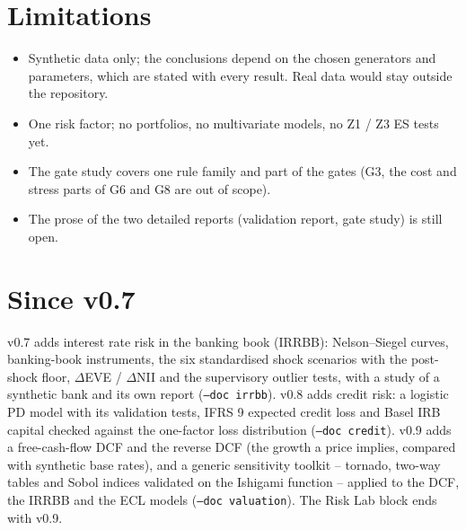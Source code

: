 \documentclass[11pt,a4paper]{article}
\begin{document}
\section*{Limitations}
\begin{itemize}
\item Synthetic data only; the conclusions depend on the chosen generators and parameters, which are stated with
  every result. Real data would stay outside the repository.
\item One risk factor; no portfolios, no multivariate models, no Z1 / Z3 ES tests yet.
\item The gate study covers one rule family and part of the gates (G3, the cost and stress parts of G6 and G8 are
  out of scope).
\item The prose of the two detailed reports (validation report, gate study) is still open.
\end{itemize}

\section*{Since v0.7}
v0.7 adds interest rate risk in the banking book (IRRBB): Nelson--Siegel curves, banking-book instruments, the six
standardised shock scenarios with the post-shock floor, $\Delta$EVE / $\Delta$NII and the supervisory outlier
tests, with a study of a synthetic bank and its own report (\texttt{--doc irrbb}). v0.8 adds credit risk: a logistic
PD model with its validation tests, IFRS 9 expected credit loss and Basel IRB capital checked against the one-factor
loss distribution (\texttt{--doc credit}). v0.9 adds a free-cash-flow DCF and the reverse DCF (the growth a price
implies, compared with synthetic base rates), and a generic sensitivity toolkit -- tornado, two-way tables and
Sobol indices validated on the Ishigami function -- applied to the DCF, the IRRBB and the ECL models
(\texttt{--doc valuation}). The Risk Lab block ends with v0.9.
\end{document}

